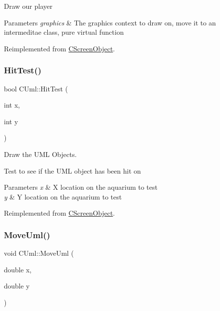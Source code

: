 Draw our player 
\begin{DoxyParams}{Parameters}
{\em graphics} & The graphics context to draw on, move it to an intermeditae class, pure virtual function \\
\hline
\end{DoxyParams}


Reimplemented from \mbox{\hyperlink{class_c_screen_object_ad9481ae325ca2374986c61fb6545fbe2}{C\+Screen\+Object}}.

\mbox{\label{class_c_uml_a5f0281b47a5bb0ec6c4e6b9c83a7efd4}} 
\subsubsection{\texorpdfstring{HitTest()}{HitTest()}}
{\footnotesize\ttfamily bool C\+Uml\+::\+Hit\+Test (\begin{DoxyParamCaption}\item[{int}]{x,  }\item[{int}]{y }\end{DoxyParamCaption})\hspace{0.3cm}{\ttfamily [virtual]}}



Draw the U\+ML Objects. 

Test to see if the U\+ML object has been hit on 
\begin{DoxyParams}{Parameters}
{\em x} & X location on the aquarium to test \\
\hline
{\em y} & Y location on the aquarium to test \\
\hline
\end{DoxyParams}


Reimplemented from \mbox{\hyperlink{class_c_screen_object_a92a3f69608fa214184c0c82a33569a07}{C\+Screen\+Object}}.

\mbox{\label{class_c_uml_ac976ed21769ae13c888932a6e6239dd0}} 
\subsubsection{\texorpdfstring{MoveUml()}{MoveUml()}}
{\footnotesize\ttfamily void C\+Uml\+::\+Move\+Uml (\begin{DoxyParamCaption}\item[{double}]{x,  }\item[{double}]{y }\end{DoxyParamCaption})}

